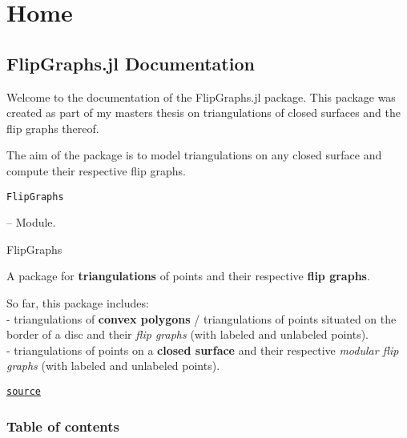 \newcommand{\DocMainTitle}{FlipGraphs.jl}
\newcommand{\DocVersion}{}
\newcommand{\DocAuthors}{}
\newcommand{\JuliaVersion}{1.6.7}




\part{Home}


\chapter{FlipGraphs.jl Documentation}



\label{9941595177337991025}{}


Welcome to the documentation of the FlipGraphs.jl package.  This package was created as part of my master{\textquotesingle}s thesis on triangulations of closed surfaces and the flip graphs thereof.



The aim of the package is to model triangulations on any closed surface and  compute their respective flip graphs.


\hypertarget{2470651749692249226}{\texttt{FlipGraphs}}  -- {Module.}

\begin{adjustwidth}{2em}{0pt}

FlipGraphs

A package for \textbf{triangulations} of points and their respective \textbf{flip graphs}.

So far, this package includes:\\
- triangulations of \textbf{convex polygons} / triangulations of points situated on the border of a disc and their \emph{flip graphs} (with labeled and unlabeled points).\\
- triangulations of points on a \textbf{closed surface} and their respective \emph{modular flip graphs} (with labeled and unlabeled points).



\href{https://github.com/schto223/FlipGraphs.jl/blob/e35d43698a06b86273148826b79d585ba04fcd26/src/FlipGraphs.jl#L9-L17}{\texttt{source}}


\end{adjustwidth}

\section{Table of contents}



